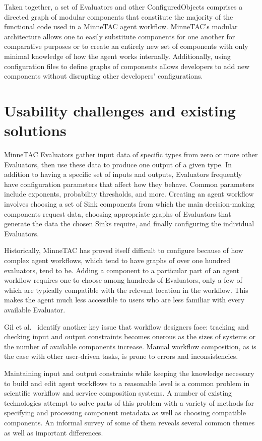 \documentclass{article}
\begin{document}
Taken together, a set of Evaluators and other ConfiguredObjects comprises a directed graph of modular components that constitute the majority of the functional code used in a MinneTAC agent workflow.
MinneTAC's modular architecture allows one to easily substitute components for one another for comparative purposes or to create an entirely new set of components with only minimal knowledge of how the agent works internally.
Additionally, using configuration files to define graphs of components allows developers to add new components without disrupting other developers' configurations.

\section{Usability challenges and existing solutions}
\label{sec:challenges}

MinneTAC Evaluators gather input data of specific types from zero or more other Evaluators, then use these data to produce one output of a given type.
In addition to having a specific set of inputs and outputs, Evaluators frequently have configuration parameters that affect how they behave.
Common parameters include exponents, probability thresholds, and more.
Creating an agent workflow involves choosing a set of Sink components from which the main decision-making components request data, choosing appropriate graphs of Evaluators that generate the data the chosen Sinks require, and finally configuring the individual Evaluators.~\cite{Collins08TR}

Historically, MinneTAC has proved itself difficult to configure because of how complex agent workflows, which tend to have graphs of over one hundred evaluators, tend to be.
Adding a component to a particular part of an agent workflow requires one to choose among hundreds of Evaluators, only a few of which are typically compatible with the relevant location in the workflow.
This makes the agent much less accessible to users who are less familiar with every available Evaluator.

Gil et al.~\cite{gil2010wings} identify another key issue that workflow designers face:  tracking and checking input and output constraints becomes onerous as the sizes of systems or the number of available components increase.
Manual workflow composition, as is the case with other user-driven tasks, is prone to errors and inconsistencies.

Maintaining input and output constraints while keeping the knowledge necessary to build and edit agent workflows to a reasonable level is a common problem in scientific workflow and service composition systems.
A number of existing technologies attempt to solve parts of this problem with a variety of methods for specifying and processing component metadata as well as choosing compatible components.
An informal survey of some of them reveals several common themes as well as important differences.
\end{document}
